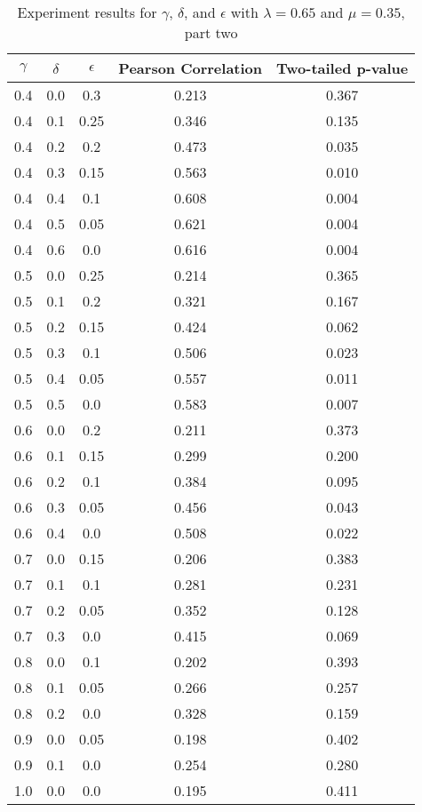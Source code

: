 \documentclass{article}
\begin{document}
\begin{table}[h!]
\centering
\begin{tabular}{|c|c|c||c|c|}
	\hline
	$\gamma$ & $\delta$ & $\epsilon$ & Pearson Correlation & Two-tailed p-value \\
	\hline
	\hline
	0.4 & 0.0 & 0.3 & 0.213 & 0.367 \\
	0.4 & 0.1 & 0.25 & 0.346 & 0.135 \\
	0.4 & 0.2 & 0.2 & 0.473 & 0.035 \\
	0.4 & 0.3 & 0.15 & 0.563 & 0.010 \\
	0.4 & 0.4 & 0.1 & 0.608 & 0.004 \\
	0.4 & 0.5 & 0.05 & 0.621 & 0.004 \\
	0.4 & 0.6 & 0.0 & 0.616 & 0.004 \\
	\hline
	0.5 & 0.0 & 0.25 & 0.214 & 0.365 \\
	0.5 & 0.1 & 0.2 & 0.321 & 0.167 \\
	0.5 & 0.2 & 0.15 & 0.424 & 0.062 \\
	0.5 & 0.3 & 0.1 & 0.506 & 0.023 \\
	0.5 & 0.4 & 0.05 & 0.557 & 0.011 \\
	0.5 & 0.5 & 0.0 & 0.583 & 0.007 \\
	\hline
	0.6 & 0.0 & 0.2 & 0.211 & 0.373 \\
	0.6 & 0.1 & 0.15 & 0.299 & 0.200 \\
	0.6 & 0.2 & 0.1 & 0.384 & 0.095 \\
	0.6 & 0.3 & 0.05 & 0.456 & 0.043 \\
	0.6 & 0.4 & 0.0 & 0.508 & 0.022 \\
	\hline
	0.7 & 0.0 & 0.15 & 0.206 & 0.383 \\
	0.7 & 0.1 & 0.1 & 0.281 & 0.231 \\
	0.7 & 0.2 & 0.05 & 0.352 & 0.128 \\
	0.7 & 0.3 & 0.0 & 0.415 & 0.069 \\
	\hline
	0.8 & 0.0 & 0.1 & 0.202 & 0.393 \\
	0.8 & 0.1 & 0.05 & 0.266 & 0.257 \\
	0.8 & 0.2 & 0.0 & 0.328 & 0.159 \\
	\hline
	0.9 & 0.0 & 0.05 & 0.198 & 0.402 \\
	0.9 & 0.1 & 0.0 & 0.254 & 0.280 \\
	\hline
	1.0 & 0.0 & 0.0 & 0.195 & 0.411 \\
	\hline
\end{tabular}
\caption{Experiment results for $\gamma$, $\delta$, and $\epsilon$ with $\lambda = 0.65$ and $\mu = 0.35$, part two}
\label{table:gammaresults2}
\end{table}
\end{document}

